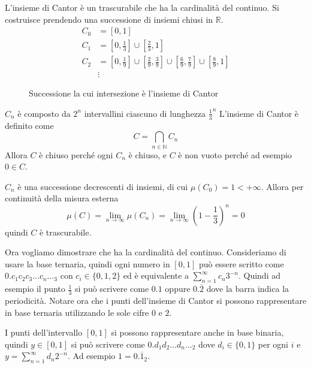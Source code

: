\begin{example}\label{ex:cantor}
    L'insieme di Cantor è un trascurabile che ha la cardinalità del continuo.
    Si costruisce prendendo una successione di insiemi chiusi in \(\mathbb{R}\). 
    \begin{align*}
        C_{0} &= [0, 1] \\
        C_{1} &= \left[ 0, \frac{1}{3} \right] \cup \left[ \frac{2}{3}, 1 \right] \\
        C_{2} &= \left[ 0, \frac{1}{9} \right] \cup \left[ \frac{2}{9}, \frac{3}{9} \right] \cup \left[ \frac{6}{9}, \frac{7}{9} \right] \cup \left[ \frac{8}{9}, 1 \right] \\
        &\vdots
    \end{align*}
\begin{figure}[ht]
    \centering
    \caption{Successione la cui intersezione è l'insieme di Cantor}\label{fig:cantor}
\end{figure}
    \(C_{n}\) è composto da \(2^{n}\) intervallini ciascuno di lunghezza
    \(\frac{1}{3}^{n}\) 
    L'insieme di Cantor è definito come
    \begin{equation}\label{eq:cantor}
        C = \bigcap_{n \in \mathbb{N}} C_{n}
    \end{equation}
    Allora \(C\) è chiuso perché ogni \(C_{n}\) è chiuso, e \(C\) è non vuoto
    perché ad esempio \(0 \in C\).

    \(C_{n}\) è una successione decrescenti di insiemi, di cui \(\mu(C_{0}) = 1
    < +\infty\). Allora per continuità della misura esterna
    \[
        \mu(C) = \lim_{n \to \infty} \mu(C_{n}) = \lim_{n \to \infty} {\left( 1 -
    \frac{1}{3} \right)}^{n} = 0
    \]
    quindi \(C\) è trascurabile.

    Ora vogliamo dimostrare che ha la cardinalità del continuo. Consideriamo di
    usare la base ternaria, quindi ogni numero in \([0, 1]\) può essere scritto
    come \(0.c_{1}c_{2}c_{3}\dots c_{n}\dots_3\) con \(c_{i}\in \{0, 1, 2\}\) ed è
    equivalente a \(\sum_{n=1}^{\infty} c_n 3^{-n}\). Quindi ad esempio il punto
    \(\frac{1}{3}\) si può scrivere come \(0.1\) oppure \(0.\overline{2}\) dove
    la barra indica la periodicità. Notare ora che i punti dell'insieme di
    Cantor si possono rappresentare in base ternaria utilizzando le sole cifre
    \(0\) e \(2\).

    I punti dell'intervallo \([0, 1]\) si possono rappresentare
    anche in base binaria, quindi \(y \in [0, 1]\) si può scrivere come
    \(0.d_{1}d_{2}\dots d_{n} \dots_2\) dove \(d_{i} \in \{0, 1\}\) per ogni
    \(i\) e \(y = \sum_{n=1}^{\infty} d_{n} 2^{-n} \). Ad esempio \(1 =
    0.\overline{1}_2\).


\end{example}

